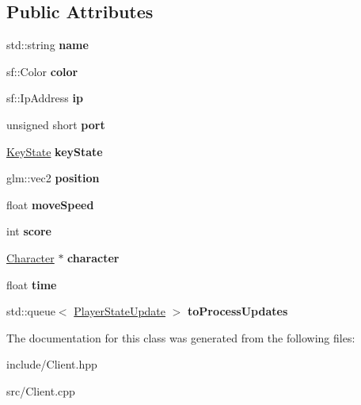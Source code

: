 \subsection*{Public Attributes}
\begin{DoxyCompactItemize}
\item 
\hypertarget{class_client_a989817815d95a2a9d22826c310613456}{std\-::string {\bfseries name}}\label{class_client_a989817815d95a2a9d22826c310613456}

\item 
\hypertarget{class_client_a32459cc221099ee08f9efbedff6d0202}{sf\-::\-Color {\bfseries color}}\label{class_client_a32459cc221099ee08f9efbedff6d0202}

\item 
\hypertarget{class_client_a8decfde115f9eff24b7c90b6e797a9ed}{sf\-::\-Ip\-Address {\bfseries ip}}\label{class_client_a8decfde115f9eff24b7c90b6e797a9ed}

\item 
\hypertarget{class_client_a33fcf8444e9ca2aec694c407ef1328e1}{unsigned short {\bfseries port}}\label{class_client_a33fcf8444e9ca2aec694c407ef1328e1}

\item 
\hypertarget{class_client_a03e62307136097e5e75156fd48f09bce}{\hyperlink{class_key_state}{Key\-State} {\bfseries key\-State}}\label{class_client_a03e62307136097e5e75156fd48f09bce}

\item 
\hypertarget{class_client_a3fc56e86ac001808f8a2167b98589bed}{glm\-::vec2 {\bfseries position}}\label{class_client_a3fc56e86ac001808f8a2167b98589bed}

\item 
\hypertarget{class_client_a4ad236f78ce7d19233b8b84a5fec8fb7}{float {\bfseries move\-Speed}}\label{class_client_a4ad236f78ce7d19233b8b84a5fec8fb7}

\item 
\hypertarget{class_client_a3614159a22947533499256eae1fca0b2}{int {\bfseries score}}\label{class_client_a3614159a22947533499256eae1fca0b2}

\item 
\hypertarget{class_client_afb22730fd5545399680be4df6acbd956}{\hyperlink{class_character}{Character} $\ast$ {\bfseries character}}\label{class_client_afb22730fd5545399680be4df6acbd956}

\item 
\hypertarget{class_client_a262045d2594ceedbb8bbeff5929ae982}{float {\bfseries time}}\label{class_client_a262045d2594ceedbb8bbeff5929ae982}

\item 
\hypertarget{class_client_a340d9f9680a7059fe60c7a7cdbe92969}{std\-::queue$<$ \hyperlink{class_player_state_update}{Player\-State\-Update} $>$ {\bfseries to\-Process\-Updates}}\label{class_client_a340d9f9680a7059fe60c7a7cdbe92969}

\end{DoxyCompactItemize}


The documentation for this class was generated from the following files\-:\begin{DoxyCompactItemize}
\item 
include/Client.\-hpp\item 
src/Client.\-cpp\end{DoxyCompactItemize}
